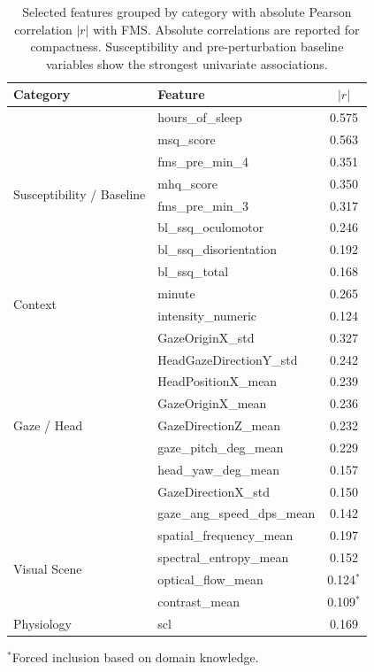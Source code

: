 \documentclass[review]{vgtc}              %
\begin{document}
\begin{table}[tb]
\centering
\caption{Selected features grouped by category with absolute Pearson correlation $|r|$ with FMS. Absolute correlations are reported for compactness. Susceptibility and pre-perturbation baseline variables show the strongest univariate associations.}
\label{tab:features}
\scriptsize
\begin{tabular}{llc}
\toprule
\textbf{Category} & \textbf{Feature} & $|r|$ \\
\midrule
\multirow{8}{*}{Susceptibility / Baseline}
  & hours\_of\_sleep & 0.575 \\
  & msq\_score & 0.563 \\
  & fms\_pre\_min\_4 & 0.351 \\
  & mhq\_score & 0.350 \\
  & fms\_pre\_min\_3 & 0.317 \\
  & bl\_ssq\_oculomotor & 0.246 \\
  & bl\_ssq\_disorientation & 0.192 \\
  & bl\_ssq\_total & 0.168 \\
\midrule
\multirow{2}{*}{Context}
  & minute & 0.265 \\
  & intensity\_numeric & 0.124 \\
\midrule
\multirow{9}{*}{Gaze / Head}
  & GazeOriginX\_std & 0.327 \\
  & HeadGazeDirectionY\_std & 0.242 \\
  & HeadPositionX\_mean & 0.239 \\
  & GazeOriginX\_mean & 0.236 \\
  & GazeDirectionZ\_mean & 0.232 \\
  & gaze\_pitch\_deg\_mean & 0.229 \\
  & head\_yaw\_deg\_mean & 0.157 \\
  & GazeDirectionX\_std & 0.150 \\
  & gaze\_ang\_speed\_dps\_mean & 0.142 \\
\midrule
\multirow{4}{*}{Visual Scene}
  & spatial\_frequency\_mean & 0.197 \\
  & spectral\_entropy\_mean & 0.152 \\
  & optical\_flow\_mean & 0.124$^{*}$ \\
  & contrast\_mean & 0.109$^{*}$ \\
\midrule
\multirow{1}{*}{Physiology}
  & scl & 0.169 \\
\bottomrule
\end{tabular}
\vspace{2pt}
\begin{flushleft}
\scriptsize $^{*}$Forced inclusion based on domain knowledge.
\end{flushleft}
\end{table}
\end{document}
